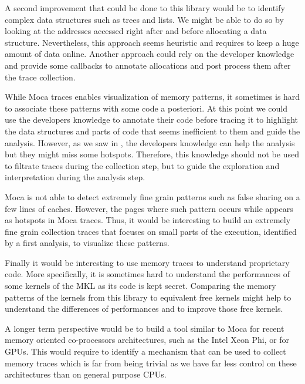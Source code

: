 A second improvement that could be done to this library would be to identify complex data structures such as trees and lists.
We might be able to do so by looking at the addresses accessed right after and before allocating a data structure.
Nevertheless, this approach seems heuristic and requires to keep a huge amount of data online.
Another approach could rely on the developer knowledge and provide some callbacks to annotate allocations and post process them after the trace collection.

While \gls{Moca} traces enables visualization of memory patterns, it sometimes is hard to associate these patterns with some code a posteriori.
At this point we could use the developers knowledge to annotate their code before tracing it to highlight the data structures and parts of code that seems inefficient to them and guide the analysis.
However, as we saw in , the developers knowledge can help the analysis but they might miss some hotspots.
Therefore, this knowledge should not be used to filtrate traces during the collection step, but to guide the exploration and interpretation during the analysis step.

\gls{Moca} is not able to detect extremely fine grain patterns such as false sharing on a few lines of caches.
However, the pages where such pattern occurs while appears as hotspots in \gls{Moca} traces.
Thus, it would be interesting to build an extremely fine grain collection traces that focuses on small parts of the execution, identified by a first analysis, to visualize these patterns.

Finally it would be interesting to use memory traces to understand proprietary code.
More specifically, it is sometimes hard to understand the performances of some kernels of the \gls{MKL} as its code is kept secret.
Comparing the memory patterns of the kernels from this library to equivalent free kernels might help to understand the differences of performances and to improve those free kernels.

A longer term perspective would be to build a tool similar to \gls{Moca} for recent memory oriented co-processors architectures, such as the \gls{Intel} Xeon Phi, or for \glspl{GPU}.
This would require to identify a mechanism that can be used to collect memory traces which is far from being trivial as we have far less control on these architectures than on general purpose \glspl{CPU}.
